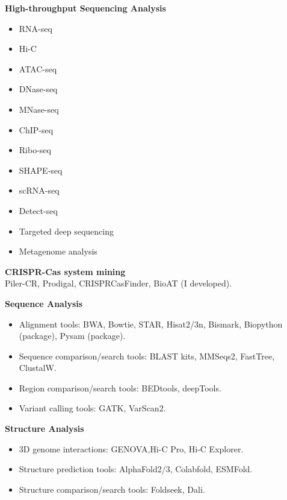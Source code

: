 \textbf{High-throughput Sequencing Analysis}
\begin{multicols}{3} %
\begin{itemize}
    \item RNA-seq
    \item Hi-C
    \item ATAC-seq
    \item DNase-seq
\end{itemize}  
  
\columnbreak %
  
\begin{itemize}  
    \item MNase-seq
    \item ChIP-seq
    \item Ribo-seq
    \item SHAPE-seq
\end{itemize}  
  
\columnbreak %
  
\begin{itemize}  
    \item scRNA-seq
    \item Detect-seq
    \item Targeted deep sequencing
    \item Metagenome analysis
\end{itemize}
\end{multicols}

\textbf{CRISPR-Cas system mining}\\
Piler-CR, Prodigal, CRISPRCasFinder, BioAT (I developed).


\textbf{Sequence Analysis}
\begin{itemize}
    \item Alignment tools: BWA, Bowtie, STAR, Hisat2/3n, Bismark, Biopython (package), Pysam (package).
    \item Sequence comparison/search tools: BLAST kits, MMSeqs2, FastTree, ClustalW.
    \item Region comparison/search tools: BEDtools, deepTools.
    \item Variant calling tools: GATK, VarScan2.
\end{itemize}

\textbf{Structure Analysis}
\begin{itemize}
    \item 3D genome interactions: GENOVA,Hi-C Pro, Hi-C Explorer.
    \item Structure prediction tools: AlphaFold2/3, Colabfold, ESMFold.
    \item Structure comparison/search tools: Foldseek, Dali.
\end{itemize}

